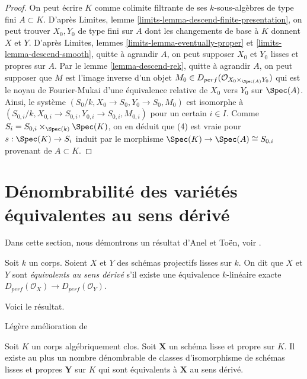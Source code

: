 \begin{proof}
\medskip\noindent
On peut écrire $K$ comme colimite filtrante de ses
$k$-sous-algèbres de type fini $A \subset K$. D'après
Limites, lemme \ref{limits-lemma-descend-finite-presentation},
on peut trouver $X_0, Y_0$ de type fini sur $A$ dont les
changements de base à $K$ donnent $X$ et $Y$.
D'après Limites, lemmes
\ref{limits-lemma-eventually-proper} et \ref{limits-lemma-descend-smooth},
quitte à agrandir $A$, on peut supposer $X_0$ et $Y_0$
lisses et propres sur $A$.
Par le lemme \ref{lemma-descend-rek},
quitte à agrandir $A$, on peut supposer que $M$ est l'image inverse d'un
objet $M_0  \in D_{perf}(\mathcal{O}_{X_0 \times_{\Spec(A)} Y_0})$
qui est le noyau de Fourier-Mukai d'une équivalence relative
de $X_0$ vers $Y_0$ sur $\Spec(A)$.
Ainsi, le système $(S_0/k, X_0 \to S_0, Y_0 \to S_0, M_0)$
est isomorphe à
$(S_{0, i}/k, X_{0, i} \to S_{0, i}, Y_{0, i} \to S_{0, i}, M_{0, i})$
pour un certain $i \in I$.
Comme $S_i = S_{0, i} \times_{\Spec(k)} \Spec(K)$,
on en déduit que (4) est vraie pour $s : \Spec(K) \to S_i$
induit par le morphisme $\Spec(K) \to \Spec(A) \cong S_{0, i}$
provenant de $A \subset K$.
\end{proof}








\section{Dénombrabilité des variétés équivalentes au sens dérivé}
\label{section-countable-derived-equivalent}

\noindent
Dans cette section, nous démontrons un résultat d'Anel et To\"en, voir \cite{AT}.

\begin{definition}
\label{definition-derived-equivalent}
Soit $k$ un corps. Soient $X$ et $Y$ des schémas projectifs lisses sur $k$.
On dit que $X$ et $Y$ sont {\it équivalents au sens dérivé} s'il existe une équivalence $k$-linéaire
exacte
$D_{perf}(\mathcal{O}_X) \to D_{perf}(\mathcal{O}_Y)$.
\end{definition}

\noindent
Voici le résultat.

\begin{theorem}
\label{theorem-countable}
\begin{reference}
Légère amélioration de \cite{AT}
\end{reference}
Soit $K$ un corps algébriquement clos. Soit $\mathbf{X}$ un schéma lisse et propre
sur $K$. Il existe au plus un nombre dénombrable de classes d'isomorphisme
de schémas lisses et propres $\mathbf{Y}$ sur $K$ qui sont
équivalents à $\mathbf{X}$ au sens dérivé.
\end{theorem}

